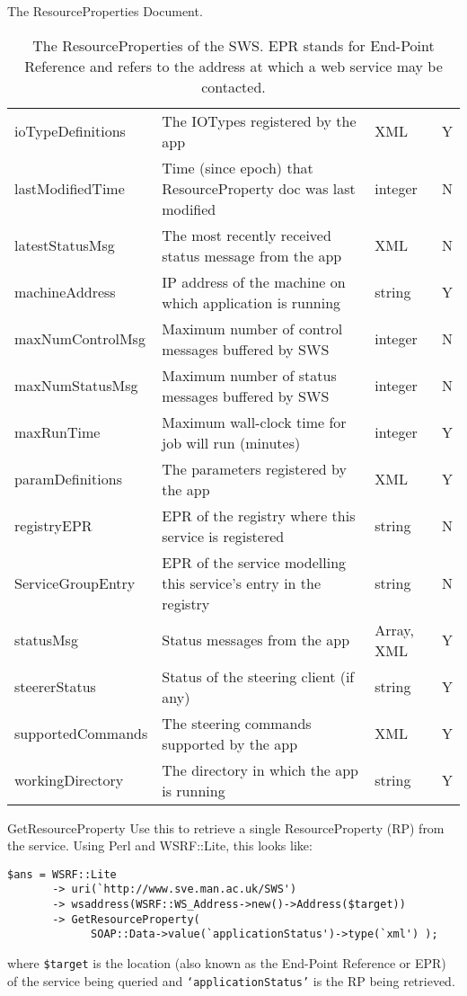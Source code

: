 \documentclass[a4paper]{article}
\begin{document}
\begin{section}{The ResourceProperties Document.}
\begin{table}
\begin{center}
\begin{tabular}{l|p{6cm}|l|c}
ioTypeDefinitions  & The IOTypes registered by the app & XML & Y \\
lastModifiedTime   & Time (since epoch) that ResourceProperty doc was last modified & integer & N\\
latestStatusMsg    & The most recently received status message from the app & XML & N\\
machineAddress     & IP address of the machine on which application is running & string & Y\\
maxNumControlMsg   & Maximum number of control messages buffered by SWS & integer & N\\
maxNumStatusMsg    & Maximum number of status messages buffered by SWS & integer & N\\
maxRunTime         & Maximum wall-clock time for job will run (minutes) & integer & Y\\
paramDefinitions   & The parameters registered by the app & XML & Y\\
registryEPR        & EPR of the registry where this service is registered & string & N\\
ServiceGroupEntry  & EPR of the service modelling this service's entry in the registry & string & N\\
statusMsg          & Status messages from the app & Array, XML & Y\\
steererStatus      & Status of the steering client (if any) & string & Y\\
supportedCommands  & The steering commands supported by the app & XML & Y\\
workingDirectory   & The directory in which the app is running & string & Y\\
\hline\hline
\end{tabular}
\end{center}
\caption{The ResourceProperties of the SWS.  EPR stands for End-Point
Reference and refers to the address at which a web service may be
contacted.}
\label{tab:resourceProps}
\end{table}

\begin{subsection}{GetResourceProperty}
Use this to retrieve a single ResourceProperty (RP) from the service.  Using
Perl and WSRF::Lite, this looks like:
\begin{verbatim}
$ans = WSRF::Lite
       -> uri(`http://www.sve.man.ac.uk/SWS')
       -> wsaddress(WSRF::WS_Address->new()->Address($target))
       -> GetResourceProperty( 
             SOAP::Data->value(`applicationStatus')->type(`xml') );
\end{verbatim}
where \texttt{\$target} is the location (also known as the End-Point
Reference or EPR) of the service being queried and
\texttt{`applicationStatus'} is the RP being retrieved.
\end{subsection}


\end{section}
\end{document}
